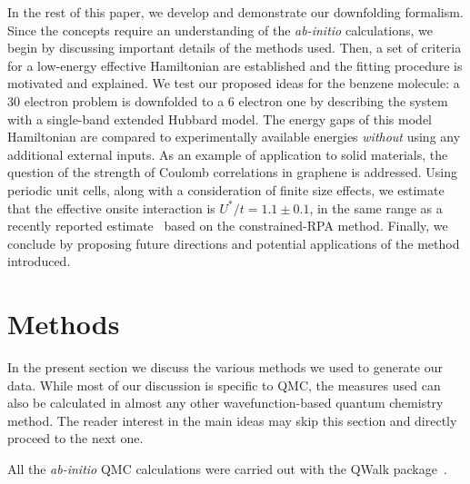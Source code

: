 \documentclass[aip,jcp,twocolumn,10pt]{revtex4-1}
\begin{document}
In the rest of this paper, we develop and demonstrate our downfolding formalism. 
Since the concepts require an understanding 
of the \emph{ab-initio} calculations, we begin by discussing important details of the methods used.
Then, a set of criteria for a low-energy effective Hamiltonian are 
established and the fitting procedure is motivated and 
explained. We test our proposed ideas for the benzene molecule: 
a 30 electron problem is downfolded to a 6 electron one by describing the system with 
a single-band extended Hubbard model. The energy gaps of this model Hamiltonian 
are compared to experimentally available energies \emph{without} 
using any additional external inputs. 
As an example of application to solid materials, 
the question of the strength of Coulomb correlations in graphene is addressed. 
Using periodic unit cells, along with a consideration of finite size effects, 
we estimate that the effective onsite interaction is $U^{*}/t = 1.1 \pm 0.1 $, 
in the same range as a recently reported estimate~\cite{Schuler_graphene} 
based on the constrained-RPA method. Finally, we conclude by proposing 
future directions and potential applications of the method introduced. 

\section{Methods}
In the present section we discuss the various methods we used to generate our data. 
While most of our discussion is specific to QMC, 
the measures used can also be calculated in 
almost any other wavefunction-based quantum chemistry method. 
The reader interest in the main ideas may skip this section and directly proceed 
to the next one. 

All the \emph{ab-initio} QMC calculations were carried 
out with the QWalk package~\cite{QWALK}.
   
\end{document}
